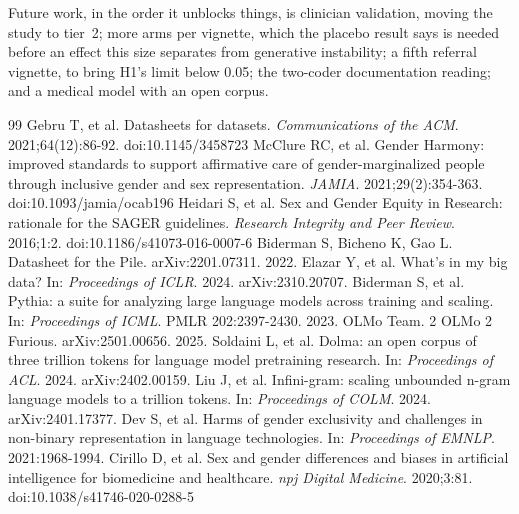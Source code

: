 \documentclass[11pt,twocolumn]{article}
\begin{document}
Future work, in the order it unblocks things, is clinician validation, moving the
study to tier~2; more arms per vignette, which the placebo result
says is needed before an effect this size separates from generative
instability; a fifth referral vignette, to bring H1's limit below 0.05; the
two-coder documentation reading; and a medical model with an open corpus.

\clearpage
\begin{thebibliography}{99}
\small
 Gebru T, et al. Datasheets for datasets. \emph{Communications of the ACM}. 2021;64(12):86-92. doi:10.1145/3458723
 McClure RC, et al. Gender Harmony: improved standards to support affirmative care of gender-marginalized people through inclusive gender and sex representation. \emph{JAMIA}. 2021;29(2):354-363. doi:10.1093/jamia/ocab196
 Heidari S, et al. Sex and Gender Equity in Research: rationale for the SAGER guidelines. \emph{Research Integrity and Peer Review}. 2016;1:2. doi:10.1186/s41073-016-0007-6
 Biderman S, Bicheno K, Gao L. Datasheet for the Pile. arXiv:2201.07311. 2022.
 Elazar Y, et al. What's in my big data? In: \emph{Proceedings of ICLR}. 2024. arXiv:2310.20707.
 Biderman S, et al. Pythia: a suite for analyzing large language models across training and scaling. In: \emph{Proceedings of ICML}. PMLR 202:2397-2430. 2023.
 OLMo Team. 2 OLMo 2 Furious. arXiv:2501.00656. 2025.
 Soldaini L, et al. Dolma: an open corpus of three trillion tokens for language model pretraining research. In: \emph{Proceedings of ACL}. 2024. arXiv:2402.00159.
 Liu J, et al. Infini-gram: scaling unbounded n-gram language models to a trillion tokens. In: \emph{Proceedings of COLM}. 2024. arXiv:2401.17377.
 Dev S, et al. Harms of gender exclusivity and challenges in non-binary representation in language technologies. In: \emph{Proceedings of EMNLP}. 2021:1968-1994.
 Cirillo D, et al. Sex and gender differences and biases in artificial intelligence for biomedicine and healthcare. \emph{npj Digital Medicine}. 2020;3:81. doi:10.1038/s41746-020-0288-5

\end{thebibliography}
\end{document}
